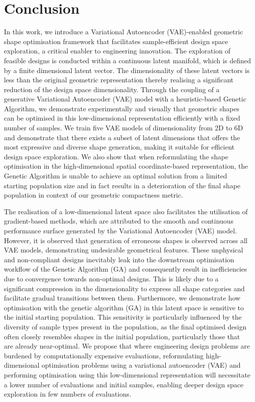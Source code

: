 \documentclass{article}
\begin{document}
\newpage{}
\section{Conclusion}

In this work, we introduce a Variational Autoencoder (VAE)-enabled geometric shape optimisation framework that facilitates sample-efficient design space exploration, a critical enabler to engineering innovation. The exploration of feasible designs is conducted within a continuous latent manifold, which is defined by a finite dimensional latent vector. The dimensionality of these latent vectors is less than the original geometric representation thereby realising a significant reduction of the design space dimensionality.
Through the coupling of a generative Variational Autoencoder (VAE) model with a heuristic-based Genetic Algorithm, we demonstrate experimentally and visually that geometric shapes can be optimised in this low-dimensional representation efficiently with a fixed number of samples. We train five VAE models of dimensionality from 2D to 6D and demonstrate that there exists a subset of latent dimensions that offers the most expressive and diverse shape generation, making it suitable for efficient design space exploration. We also show that when reformulating the shape optimisation in the high-dimensional spatial coordinate-based representation, the Genetic Algorithm is unable to achieve an optimal solution from a limited starting population size and in fact results in a deterioration of the final shape population in context of our geometric compactness metric.

The realisation of a low-dimensional latent space also facilitates the utilisation of gradient-based methods, which are attributed to the smooth and continuous performance surface generated by the Variational Autoencoder (VAE) model. However, it is observed that generation of erroneous shapes is observed across all VAE models, demonstrating undesirable geometrical features. These unphysical and non-compliant designs inevitably leak into the downstream optimisation workflow of the Genetic Algorithm (GA) and consequently result in inefficiencies due to convergence towards non-optimal designs. This is likely due to a significant compression in the dimensionality to express all shape categories and facilitate gradual transitions between them.
Furthermore, we demonstrate how optimisation with the genetic algorithm (GA) in this latent space is sensitive to the initial starting population. This sensitivity is particularly influenced by the diversity of sample types present in the population, as the final optimised design often closely resembles shapes in the initial population, particularly those that are already near-optimal. We propose that where engineering design problems are burdened by computationally expensive evaluations, reformulating high-dimensional optimisation problems using a variational autoencoder (VAE) and performing optimisation using this low-dimensional representation will necessitate a lower number of evaluations and initial samples, enabling deeper design space exploration in few numbers of evaluations.
\end{document}
